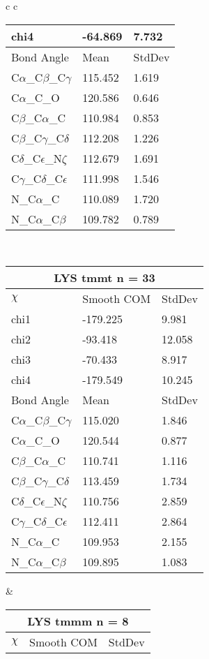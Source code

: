 \begin{longtable}{ c c }
\begin{tabular}{ l l l }
  chi4 & -64.869 & 7.732 \\ \midrule
  Bond Angle   & Mean     & StdDev \\ \midrule
  C$\alpha$\_C$\beta$\_C$\gamma$ & 115.452 & 1.619\\
  C$\alpha$\_C\_O & 120.586 & 0.646\\
  C$\beta$\_C$\alpha$\_C & 110.984 & 0.853\\
  C$\beta$\_C$\gamma$\_C$\delta$ & 112.208 & 1.226\\
  C$\delta$\_C$\epsilon$\_N$\zeta$ & 112.679 & 1.691\\
  C$\gamma$\_C$\delta$\_C$\epsilon$ & 111.998 & 1.546\\
  N\_C$\alpha$\_C & 110.089 & 1.720\\
  N\_C$\alpha$\_C$\beta$ & 109.782 & 0.789\\
  \bottomrule
  \end{tabular}
  \\
  \begin{tabular}{ l l l }
  \toprule
  \multicolumn{3}{c}{LYS \textbf{tmmt} n = 33} \\ \toprule
  $\chi$       & Smooth COM & StdDev \\ \midrule
  chi1 & -179.225 & 9.981 \\ 
  chi2 & -93.418 & 12.058 \\ 
  chi3 & -70.433 & 8.917 \\ 
  chi4 & -179.549 & 10.245 \\ \midrule
  Bond Angle   & Mean     & StdDev \\ \midrule
  C$\alpha$\_C$\beta$\_C$\gamma$ & 115.020 & 1.846\\
  C$\alpha$\_C\_O & 120.544 & 0.877\\
  C$\beta$\_C$\alpha$\_C & 110.741 & 1.116\\
  C$\beta$\_C$\gamma$\_C$\delta$ & 113.459 & 1.734\\
  C$\delta$\_C$\epsilon$\_N$\zeta$ & 110.756 & 2.859\\
  C$\gamma$\_C$\delta$\_C$\epsilon$ & 112.411 & 2.864\\
  N\_C$\alpha$\_C & 109.953 & 2.155\\
  N\_C$\alpha$\_C$\beta$ & 109.895 & 1.083\\
  \bottomrule
  \end{tabular}
  &
  \begin{tabular}{ l l l }
  \toprule
  \multicolumn{3}{c}{LYS \textbf{tmmm} n = 8} \\ \toprule
  $\chi$       & Smooth COM & StdDev \\ \midrule

\end{tabular}
\end{longtable}
